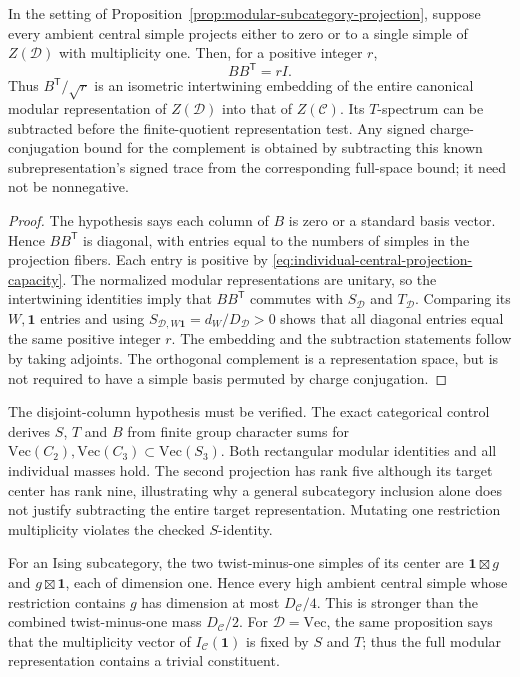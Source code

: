 \begin{corollary}
\label{cor:disjoint-central-projection}
In the setting of Proposition~\ref{prop:modular-subcategory-projection},
suppose every ambient central simple projects either to zero or to a
single simple of $Z(\mathcal D)$ with multiplicity one. Then, for a
positive integer $r$,
\[
 BB^{\mathsf T}=rI.
\]
Thus $B^{\mathsf T}/\sqrt r$ is an isometric intertwining embedding of
the entire canonical modular representation of $Z(\mathcal D)$ into
that of $Z(\mathcal C)$. Its $T$-spectrum can be subtracted before the
finite-quotient representation test. Any signed charge-conjugation
bound for the complement is obtained by subtracting this known
subrepresentation's signed trace from the corresponding full-space
bound; it need not be nonnegative.
\end{corollary}
\begin{proof}
The hypothesis says each column of $B$ is zero or a standard basis
vector. Hence $BB^{\mathsf T}$ is diagonal, with entries equal to the
numbers of simples in the projection fibers. Each entry is positive
by \eqref{eq:individual-central-projection-capacity}. The normalized
modular representations are unitary, so the intertwining identities
imply that $BB^{\mathsf T}$ commutes with $S_{\mathcal D}$ and
$T_{\mathcal D}$. Comparing its $W,\mathbf1$ entries and using
$S_{\mathcal D,W\mathbf1}=d_W/D_{\mathcal D}>0$ shows that all diagonal
entries equal the same positive integer $r$. The embedding and the
subtraction statements follow by taking adjoints. The orthogonal
complement is a representation space, but is not required to have a
simple basis permuted by charge conjugation.
\end{proof}

The disjoint-column hypothesis must be verified. The exact categorical
control 
derives $S$, $T$ and $B$ from finite group character sums for
$\mathrm{Vec}(C_2),\mathrm{Vec}(C_3)\subset\mathrm{Vec}(S_3)$.
Both rectangular modular identities and all individual masses hold.
The second projection has rank five although its target center has rank
nine, illustrating why a general subcategory inclusion alone does not
justify subtracting the entire target representation. Mutating one
restriction multiplicity violates the checked $S$-identity.

For an Ising subcategory, the two twist-minus-one simples of its center
are $\mathbf1\boxtimes g$ and $g\boxtimes\mathbf1$, each of dimension
one. Hence every high ambient central simple whose restriction contains
$g$ has dimension at most $D_{\mathcal C}/4$. This is stronger than the
combined twist-minus-one mass $D_{\mathcal C}/2$.
For $\mathcal D=\mathrm{Vec}$, the same proposition says that the
multiplicity vector of $I_{\mathcal C}(\mathbf1)$ is fixed by $S$ and $T$;
thus the full modular representation contains a trivial constituent.

